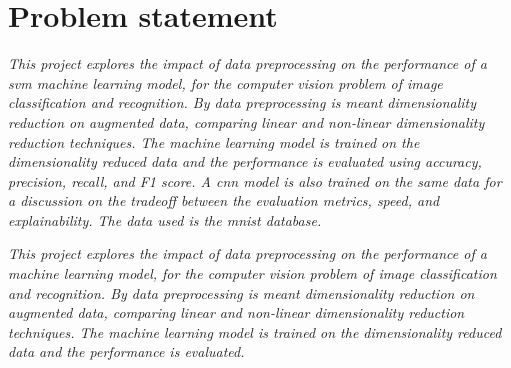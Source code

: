 \section{Problem statement}\label{sec:problem-statement}
\emph{This project explores the impact of data preprocessing on the performance of a \gls{svm} machine learning model, for the computer vision problem of image classification and recognition. By data preprocessing is meant dimensionality reduction on augmented data, comparing linear and non-linear dimensionality reduction techniques. The machine learning model is trained on the dimensionality reduced data and the performance is evaluated using accuracy, precision, recall, and F1 score. A \gls{cnn} model is also trained on the same data for a discussion on the tradeoff between the evaluation metrics, speed, and explainability. The data used is the \gls{mnist} database.}

\emph{This project explores the impact of data preprocessing on the performance of a machine learning model, for the computer vision problem of image classification and recognition. By data preprocessing is meant dimensionality reduction on augmented data, comparing linear and non-linear dimensionality reduction techniques. The machine learning model is trained on the dimensionality reduced data and the performance is evaluated.}
